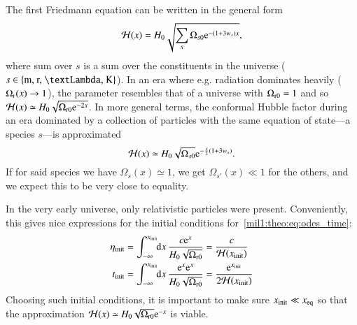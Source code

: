    The first Friedmann equation can be written in the general form
    \begin{equation}\label{mil1:theo:eq:Hp_of_x_general_form}
        \Hp(x) = H_0 \sqrt{\sum_{s}\Omega_{s0}\eu^{-(1+3w_s)x}},
    \end{equation}
    where sum over $s$ is a sum over the constituents in the universe ($s\in\left\{\text{m, r, \textLambda, K} \right\}$). In an era where e.g. radiation dominates heavily ($\OmgR[](x)\to 1$), the parameter resembles that of a universe with $\OmgR=1$ and so $\Hp(x)\simeq H_0\sqrt{\OmgR \eu^{-2x}}$. In more general terms, the conformal Hubble factor during an era dominated by a collection of particles with the same equation of state---a species $s$---is approximated
    \begin{equation}\label{mil1:theo:eq:Hp_of_x_approximated}
        \Hp(x) \simeq H_0 \sqrt{\Omega_{s0}} \eu^{-\frac{x}{2}(1+3w_s)}.
    \end{equation}
    If for said species we have $\Omega_{s}(x)\simeq 1$, we get $\Omega_{s'}(x)\ll 1$ for the others, and we expect this to be very close to equality. 

    In the very early universe, only relativistic particles were present. Conveniently, this gives nice expressions for the initial conditions for~\cref{mil1:theo:eq:odes_time}:
    \begin{subequations}\label{mil1:theo:eq:time_initial_conditions}
        \begin{align}
            \eta\ped{init} &= \int_{-\infty}^{x\ped{init}}\dx{x}\frac{c\eu^{x}}{H_0 \sqrt{\OmgR}} = \frac{c}{\Hp(x\ped{init})} \label{mil1:theo:eq:eta_init} \\
            t\ped{init} &=  \int_{-\infty}^{x\ped{init}}\dx{x} \frac{\eu^{x}\eu^{x}}{H_0 \sqrt{\OmgR}} =\frac{\eu^{x\ped{init}}}{2 \Hp(x\ped{init})} \label{mil1:theo:eq:t_init} 
        \end{align}
    \end{subequations}
    Choosing such initial conditions, it is important to make sure $x\ped{init} \ll x\ped{eq}$ so that the approximation $\Hp(x) \simeq H_0 \sqrt{\OmgR} \eu^{-x}$ is viable. 





